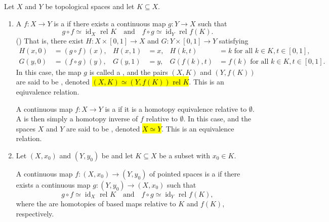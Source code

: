 \begin{definition} \label{definition:homotopy_equivalence_between_topological_spaces}
    Let $X$ and $Y$ be topological spaces and let $K \subseteq X$. 
    
    \begin{enumerate}
        \item  A  $f : X \to Y$ is a  if there exists a continuous map $g : Y \to X$ such that
        $$g \circ f \simeq \operatorname{id}_X \text{ rel } K \quad \text{and} \quad f \circ g \simeq \operatorname{id}_Y \text{ rel } f(K).$$
        ()
        That is, there exist  $H : X \times [0,1] \to X$ and $G : Y \times [0,1] \to Y$ satisfying
        \begin{align*}
        H(x,0) &= (g \circ f)(x), & H(x,1) &= x, & H(k,t) &= k \text{ for all } k \in K, t \in [0,1], \\
        G(y,0) &= (f \circ g)(y), & G(y,1) &= y, & G(f(k),t) &= f(k) \text{ for all } k \in K, t \in [0,1].
        \end{align*}
        In this case, the map $g$ is called a , and the pairs $(X,K)$ and $(Y,f(K))$ are said to be , denoted \hl{$(X,K) \simeq (Y,f(K))$ rel $K$}. This is an eqiuvalence relation.

        A continuous map $f: X \to Y$ is a  if it is a homotopy equivalence relative to $\emptyset$. A  is then simply a homotopy inverse of $f$ relative to $\emptyset$. In this case, and the spaces $X$ and $Y$ are said to be , denoted \hl{$X \simeq Y$}. This is an equivalence relation.

        \item 
        Let $(X,x_0)$ and $(Y,y_0)$ be  and let $K \subseteq X$ be a subset with $x_0 \in K$. 
        
            A continuous map $f : (X,x_0) \to (Y,y_0)$ of pointed spaces is a  if there exists a continuous map $g : (Y,y_0) \to (X,x_0)$ such that
            $$g \circ f \simeq \operatorname{id}_X \text{ rel } K \quad \text{and} \quad f \circ g \simeq \operatorname{id}_Y \text{ rel } f(K),$$
            where the  are homotopies of based maps relative to $K$ and $f(K)$, respectively.
            

\end{enumerate}
\end{definition}
